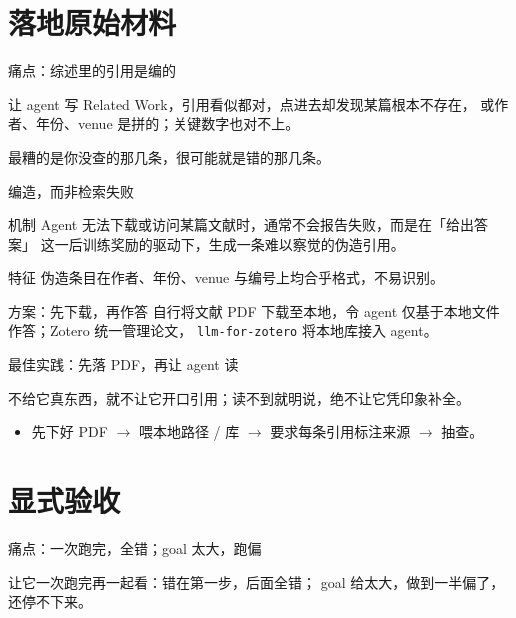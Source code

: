 \documentclass[aspectratio=169]{beamer}
\begin{document}
\section[落地材料]{落地原始材料}

\begin{frame}{\textcolor{hot}{痛点}：综述里的引用是编的}
  \begin{alertblock}{}
    让 agent 写 Related Work，引用看似都对，点进去却发现某篇根本不存在，
    或作者、年份、venue 是拼的；关键数字也对不上。
  \end{alertblock}
  \bigskip
  最糟的是\alert{你没查的那几条}，很可能就是错的那几条。
\end{frame}

\begin{frame}{编造，而非检索失败}
  \begin{block}{机制}
    Agent 无法下载或访问某篇文献时，通常不会报告失败，而是在「给出答案」
    这一后训练奖励的驱动下，生成一条难以察觉的伪造引用。
  \end{block}
  \begin{alertblock}{特征}
    伪造条目在作者、年份、venue 与编号上均合乎格式，不易识别。
  \end{alertblock}
  \begin{block}{方案：先下载，再作答}
    自行将文献 PDF 下载至本地，令 agent 仅基于本地文件作答；Zotero 统一管理论文，
    \texttt{llm-for-zotero} 将本地库接入 agent。
  \end{block}
\end{frame}

\begin{frame}{\textcolor{video}{最佳实践}：先落 PDF，再让 agent 读}
  \begin{exampleblock}{}
    不给它真东西，就不让它开口引用；读不到就明说，绝不让它凭印象补全。
  \end{exampleblock}
  \bigskip
  \begin{itemize}
    \item 先下好 PDF $\to$ 喂本地路径 / 库 $\to$ 要求每条引用标注来源 $\to$ 抽查。
  \end{itemize}
\end{frame}

\section[显式验收]{显式验收}

\begin{frame}{\textcolor{hot}{痛点}：一次跑完，全错；goal 太大，跑偏}
  \begin{alertblock}{}
    让它一次跑完再一起看：错在第一步，后面全错；
    goal 给太大，做到一半偏了，还停不下来。
  \end{alertblock}
\end{frame}
\end{document}
